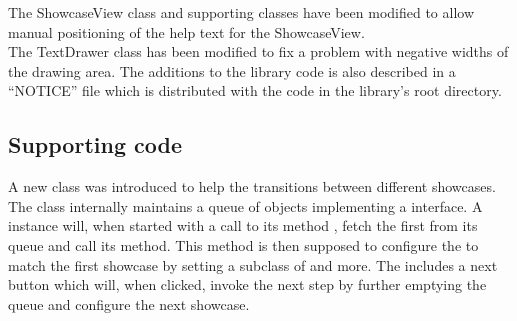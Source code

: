 The ShowcaseView class and supporting classes have been modified to allow manual positioning of the help text for the ShowcaseView.\\ 
The TextDrawer class has been modified to fix a problem with negative widths of the drawing area.
The additions to the library code is also described in a ``NOTICE'' file which is distributed with the code in the library's root directory. 

\subsection{Supporting code}

A new class  was introduced to help the transitions between different showcases. The class internally maintains a queue of objects implementing a  interface. A  instance will, when started with a call to its method , fetch the first  from its queue and call its  method. This  method is then supposed to configure the  to match the first showcase by setting a subclass of  and more. The  includes a next button which will, when clicked, invoke the next step by further emptying the queue and configure the next showcase.




